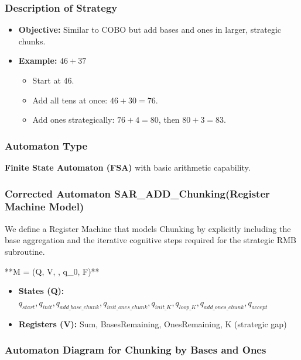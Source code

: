 \documentclass[11pt]{article}
\begin{document}
\subsubsection*{Description of Strategy}
\begin{itemize}
    \item \textbf{Objective:} Similar to COBO but add bases and ones in larger, strategic chunks.
    \item \textbf{Example:} \(46 + 37\)
    \begin{itemize}
        \item Start at \(46\).
        \item Add all tens at once: \(46 + 30 = 76\).
        \item Add ones strategically: \(76 + 4 = 80\), then \(80 + 3 = 83\).
    \end{itemize}
\end{itemize}

\subsubsection*{Automaton Type}
\textbf{Finite State Automaton (FSA)} with basic arithmetic capability.

\subsubsection*{Corrected Automaton SAR\_ADD\_Chunking(Register Machine Model)}

We define a Register Machine that models Chunking by explicitly including the base aggregation and the iterative cognitive steps required for the strategic RMB subroutine.

**M = (Q, V, \delta, q_0, F)**

\begin{itemize}
    \item \textbf{States (Q):} {$q_{start}, q_{init}, q_{add\_base\_chunk}, q_{init\_ones\_chunk}, q_{init\_K}, q_{loop\_K}, q_{add\_ones\_chunk}, q_{accept}$}
    \item \textbf{Registers (V):} {Sum, BasesRemaining, OnesRemaining, K (strategic gap)}
\end{itemize}

\subsubsection*{Automaton Diagram for Chunking by Bases and Ones}
\end{document}
